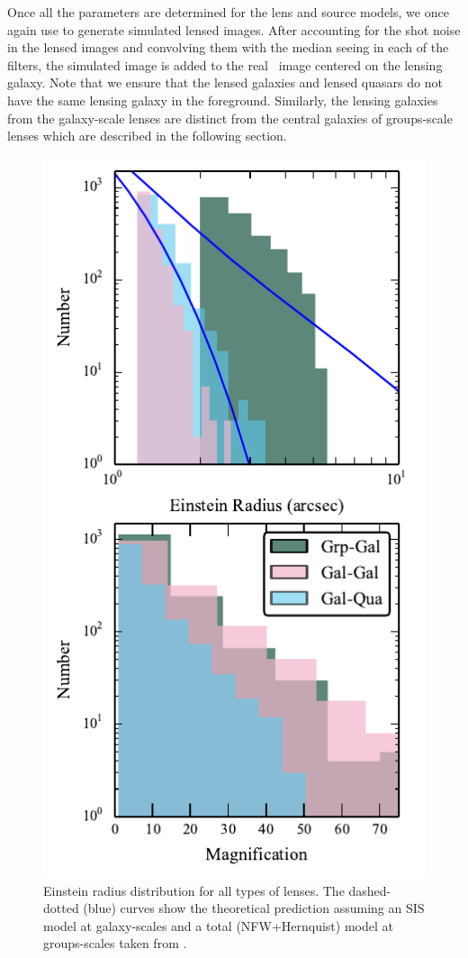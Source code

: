 \documentclass[useAMS,usenatbib,a4paper]{mn2e}
\begin{document}
Once all the parameters are determined for the lens and source models, we once
again use \gravlens to generate simulated lensed images.  After accounting for the shot
noise in the lensed images and convolving them with the median seeing in each of
the filters, the simulated image is added to the real \cfhtls~image centered
on the lensing galaxy. Note that we ensure that the lensed galaxies and
lensed quasars do not have the same lensing galaxy in the foreground. Similarly,
the lensing galaxies from the galaxy-scale lenses are distinct from the central
galaxies of groups-scale lenses which are described in the following section.


\begin{figure}
\begin{center}
\includegraphics[scale=1.2]{sw-cfhtls-figs/distrib_remu.pdf}
\caption{ \label{fig:remudist}
Einstein radius distribution for all types of lenses. The dashed-dotted (blue)
curves show the theoretical prediction assuming an SIS model at galaxy-scales
and a total (NFW+Hernquist) model at groups-scales taken from \citep{More2012}.
}
\end{center}
\end{figure}
\end{document}
